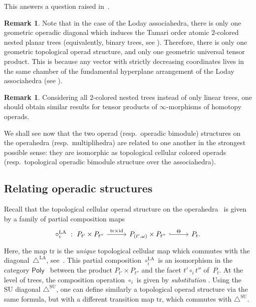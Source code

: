 \documentclass{amsart}
\theoremstyle{definition}
\newtheorem{remark}[theorem]{Remark}
\newcommand{\resp}{resp.~} %
\newcommand{\SU}{\mathrm{SU}}
\newcommand{\LA}{\mathrm{LA}}
\newcommand{\SUD}{\triangle^{\mathrm{SU}}}
\newcommand{\LAD}{\triangle^{\mathrm{LA}}}
\newcommand{\PolySub}{\mathsf{Poly}}
\newcommand{\tr}{\mathrm{tr}}
\newcommand{\id}{\mathrm{id}}
\begin{document}
This answers a question raised in~\cite[Rem.~3.9]{LaplanteAnfossiMazuir}.

\begin{remark}
	Note that in the case of the Loday associahedra, there is only one geometric operadic diagonal which induces the Tamari order atomic $2$-colored nested planar trees (equivalently, binary trees, see \cite[Fig.~6]{LaplanteAnfossiMazuir}).
	Therefore, there is only one geometric topological operad structure, and only one geometric universal tensor product.
	This is because any vector with strictly decreasing coordinates lives in the same chamber of the fundamental hyperplane arrangement of the Loday associahedra (see \cite[Ex.~1.21]{LaplanteAnfossi}).
\end{remark}

\begin{remark}
	Considering all $2$-colored nested trees instead of only linear trees, one should obtain similar results for tensor products of $\infty$-morphisms of homotopy operads.
\end{remark}

We shall see now that the two operad (\resp operadic bimodule) structures on the operahedra (\resp multiplihedra) are related to one another in the strongest possible sense: they are isomorphic as topological cellular colored operads (\resp topological operadic bimodule structure over the associahedra).


\subsection{Relating operadic structures} 
\label{subsec:iso-top-operads}

Recall that the topological cellular operad structure on the operahedra~\cite[Def.~4.17]{LaplanteAnfossi} is given by a family of partial composition maps 
\[
\vcenter{\hbox{
\begin{tikzcd}[column sep=1cm]
\circ_i^{\LA}\ : \ P_{t'}\times P_{t''}
\arrow[r,  "\tr\times \id"]
& P_{(t',\omega)}\times P_{t''}
 \arrow[r,hookrightarrow, "\Theta"]
&
P_t .
\end{tikzcd}
}}  \]
Here, the map $\tr$ is the \emph{unique} topological cellular map which commutes with the diagonal~$\LAD$, see~\cite[Prop.~7]{MasudaThomasTonksVallette}. 
This partial composition $\circ_i^\LA$ is an isomorphism in the category $\PolySub$~\cite[Def.~4.13]{LaplanteAnfossi} between the product $P_{t'}\times P_{t''}$ and the facet $t' \circ_i t''$ of~$P_t$.
At the level of trees, the composition operation $\circ_i$ is given by \emph{substitution} \cite[Fig.~14]{LaplanteAnfossi}.
Using the $\SU$ diagonal $\SUD$, one can define similarly a topological operad structure via the same formula, but with a different transition map $\tr$, which commutes with $\SUD$.
\end{document}
